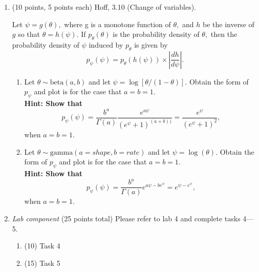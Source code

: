 \documentclass{article}
\begin{document}
\begin{enumerate}
\item (10 points, 5 points each) Hoff, 3.10 (Change of variables). 

Let $\psi= g(\theta),$ where g is a monotone function of $\theta,$ and $h$ be the inverse of $g$ so that $\theta = h(\psi).$ If $p_{\theta}(\theta)$ is the probability density of $\theta,$ then the probability density of $\psi$ induced by $p_{\theta}$ is given by 
$$p_{\psi}(\psi) = p_{\theta}(h(\psi)) \times | \frac{dh}{d\psi} |.$$
\begin{enumerate}
\item Let $\theta \sim \text{beta}(a,b)$ and let $\psi = \log[\theta/(1- \theta)].$ Obtain the form of $p_{\psi}$ and plot is for the case that $a=b=1.$  \\
\textbf{Hint: Show that $$p_{\psi}(\psi) = \frac{b^{a}}{\Gamma(a)}
\frac{e^{a\psi}}{(e^{\psi} + 1)^{(a+b))}} = \frac{e^{\psi}}{(e^{\psi} + 1)^2},$$} when $a=b=1.$
\item Let $\theta \sim \text{gamma}(a = shape,b = rate)$ and let $\psi = \log(\theta).$ Obtain the form of $p_{\psi}$ and plot is for the case that $a=b=1.$ \\
\textbf{Hint: Show that $$p_{\psi}(\psi) = \frac{b^{a}}{\Gamma(a)} e^{a\psi - be^{\psi}} = e^{\psi - e^{\psi}},$$} when $a=b=1.$
\end{enumerate}



\item {\em Lab component} 
  (25 points total) Please refer to lab 4 and complete tasks 4---5. 
  \begin{enumerate}
  \item (10) Task 4
  \item (15) Task 5
  \end{enumerate}
  
\end{enumerate}
\end{document}

